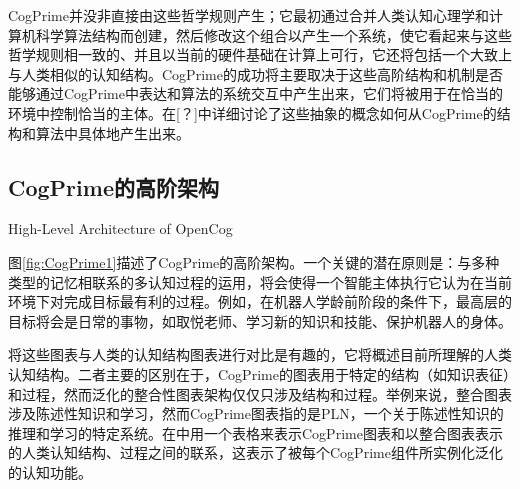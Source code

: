 CogPrime并没非直接由这些哲学规则产生；它最初通过合并人类认知心理学和计算机科学算法结构而创建，然后修改这个组合以产生一个系统，使它看起来与这些哲学规则相一致的、并且以当前的硬件基础在计算上可行，它还将包括一个大致上与人类相似的认知结构。CogPrime的成功将主要取决于这些高阶结构和机制是否能够通过CogPrime中表达和算法的系统交互中产生出来，它们将被用于在恰当的环境中控制恰当的主体。在[？]中详细讨论了这些抽象的概念如何从CogPrime的结构和算法中具体地产生出来。

\subsection{CogPrime的高阶架构}{High-Level Architecture of OpenCog}

图\ref{fig:CogPrime1}描述了CogPrime的高阶架构。一个关键的潜在原则是：与多种类型的记忆相联系的多认知过程的运用，将会使得一个智能主体执行它认为在当前环境下对完成目标最有利的过程。例如，在机器人学龄前阶段的条件下，最高层的目标将会是日常的事物，如取悦老师、学习新的知识和技能、保护机器人的身体。

将这些图表与人类的认知结构图表进行对比是有趣的\cite{Goertzel2012a}，它将概述目前所理解的人类认知结构。二者主要的区别在于，CogPrime的图表用于特定的结构（如知识表征）和过程，然而泛化的整合性图表架构仅仅只涉及结构和过程。举例来说，整合图表涉及陈述性知识和学习，然而CogPrime图表指的是PLN，一个关于陈述性知识的推理和学习的特定系统。在\cite{Goertzel2010a}中用一个表格来表示CogPrime图表和以整合图表表示的人类认知结构、过程之间的联系，这表示了被每个CogPrime组件所实例化泛化的认知功能。

